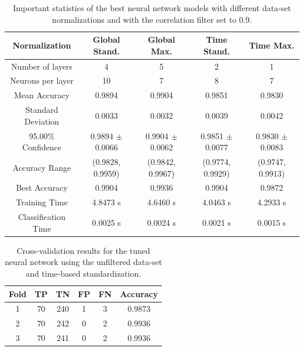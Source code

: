 \documentclass[paper=a4, fontsize=11pt]{scrartcl} %
\begin{document}
\begin{table}[H]
	\small
	\centering
\caption{Important statistics of the best neural network models with different data-set normalizations and with the correlation filter set to 0.9.}
	\label{tab:best_nn_models_filtered}
	\begin{tabular}{|c|c|c|c|c|}
		\hline
		\textbf{Normalization }        & \textbf{Global Stand.}        & \textbf{Global Max.}            & \textbf{Time Stand.}            & \textbf{Time Max.} \\ \hline \hline
		Number of layers     & 4                    & 5                      & 2                     & 1 \\ \hline
		Neurons per layer    & 10                   & 7                      & 8                     & 7 \\ \hline
		Mean Accuracy        & 0.9894               & 0.9904                 & 0.9851                & 0.9830 \\ \hline
		Standard Deviation   & 0.0033               & 0.0032                 & 0.0039                & 0.0042 \\ \hline
		95.00\% Confidence   & 0.9894 $\pm$ 0.0066  & 0.9904 $\pm$ 0.0062    & 0.9851 $\pm$ 0.0077   & 0.9830 $\pm$ 0.0083 \\ \hline
		Accuracy Range       & (0.9828, 0.9959)     & (0.9842, 0.9967)       & (0.9774, 0.9929)      & (0.9747, 0.9913) \\ \hline
		Best Accuracy        & 0.9904               & 0.9936                 & 0.9904                & 0.9872 \\ \hline
		Training Time        & 4.8473 s             & 4.6460 s               & 4.0463 s              & 4.2933 s \\ \hline
		Classification Time  & 0.0025 s             & 0.0024 s               & 0.0021 s              & 0.0015 s  \\ \hline
	\end{tabular}
\end{table}

\begin{table}[H]
	\centering
	\caption{Cross-validation results for the tuned neural network using the unfiltered data-set and time-based standardization.}
	\begin{tabular}{|c|c|c|c|c|c|}
		\hline
		\textbf{Fold} & \textbf{TP} & \textbf{TN} & \textbf{FP} & \textbf{FN} & \textbf{Accuracy} \\ \hline \hline
		1 & 70 & 240 & 1 & 3 & 0.9873  \\ \hline
		2 & 70 & 242 & 0 & 2 & 0.9936  \\ \hline
		3 & 70 & 241 & 0 & 2 & 0.9936  \\ \hline
	\end{tabular}
	\label{tab: cv_best_nn}
\end{table}
\end{document}
